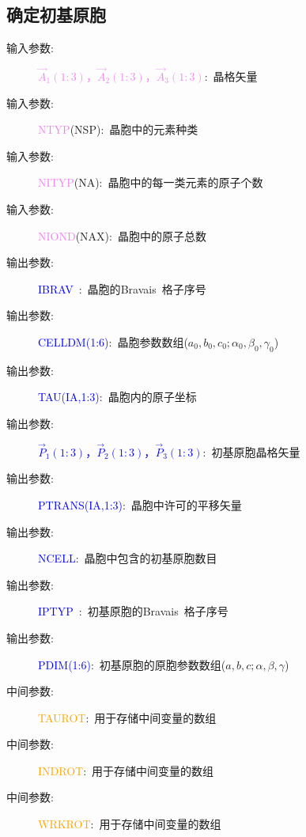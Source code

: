\documentclass{article}      %
\begin{document}
\subsection{确定初基原胞}
\begin{description}
	\item[输入参数:~]\textcolor{violet}{$\vec A_1(1:3)$，$\vec A_2(1:3)$，$\vec A_3(1:3)$}:~晶格矢量
	\item[输入参数:~]\textcolor{violet}{\textrm{NTYP}}(\textrm{NSP}):~晶胞中的元素种类
	\item[输入参数:~]\textcolor{violet}{\textrm{NITYP}}(\textrm{NA}):~晶胞中的每一类元素的原子个数
	\item[输入参数:~]\textcolor{violet}{\textrm{NIOND}}(\textrm{NAX}):~晶胞中的原子总数
	\item[输出参数:~]\textcolor{blue}{\textrm{IBRAV~}}:~晶胞的\textrm{Bravais~}格子序号
	\item[输出参数:~]\textcolor{blue}{\textrm{CELLDM}(1:6)}:~晶胞参数数组($a_0,b_0,c_0;\alpha_0,\beta_0,\gamma_0$)
	\item[输出参数:~]\textcolor{blue}{\textrm{TAU}(IA,1:3)}:~晶胞内的原子坐标
	\item[输出参数:~]\textcolor{blue}{$\vec P_1(1:3)$，$\vec P_2(1:3)$，$\vec P_3(1:3)$}:~初基原胞晶格矢量
	\item[输出参数:~]\textcolor{blue}{\textrm{PTRANS}(IA,1:3)}:~晶胞中许可的平移矢量
	\item[输出参数:~]\textcolor{blue}{\textrm{NCELL}}:~晶胞中包含的初基原胞数目
	\item[输出参数:~]\textcolor{blue}{\textrm{IPTYP~}}:~初基原胞的\textrm{Bravais~}格子序号
	\item[输出参数:~]\textcolor{blue}{\textrm{PDIM}(1:6)}:~初基原胞的原胞参数数组($a,b,c;\alpha,\beta,\gamma$)
	\item[中间参数:~]\textcolor{orange}{\textrm{TAUROT}}:~用于存储中间变量的数组
	\item[中间参数:~]\textcolor{orange}{\textrm{INDROT}}:~用于存储中间变量的数组
	\item[中间参数:~]\textcolor{orange}{\textrm{WRKROT}}:~用于存储中间变量的数组
\end{description}
\end{document}
